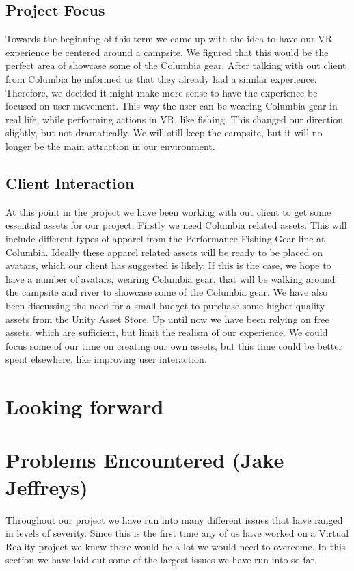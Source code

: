 \documentclass[10pt,journal,compsoc,onecolumn, draftclsnofoot]{IEEEtran}
\begin{document}
\subsection{Project Focus}
Towards the beginning of this term we came up with the idea to have our VR experience be centered around a campsite.
We figured that this would be the perfect area of showcase some of the Columbia gear.
After talking with out client from Columbia he informed us that they already had a similar experience.
Therefore, we decided it might make more sense to have the experience be focused on user movement.
This way the user can be wearing Columbia gear in real life, while performing actions in VR, like fishing.
This changed our direction slightly, but not dramatically.
We will still keep the campsite, but it will no longer be the main attraction in our environment.

\subsection{Client Interaction}
At this point in the project we have been working with out client to get some essential assets for our project.
Firstly we need Columbia related assets.
This will include different types of apparel from the Performance Fishing Gear line at Columbia.
Ideally these apparel related assets will be ready to be placed on avatars, which our client has suggested is likely.
If this is the case, we hope to have a number of avatars, wearing Columbia gear, that will be walking around the campsite and river to showcase some of the Columbia gear.
We have also been discussing the need for a small budget to purchase some higher quality assets from the Unity Asset Store.
Up until now we have been relying on free assets, which are sufficient, but limit the realism of our experience.
We could focus some of our time on creating our own assets, but this time could be better spent elsewhere, like improving user interaction.

\section{Looking forward}

\section{Problems Encountered (Jake Jeffreys)}
Throughout our project we have run into many different issues that have ranged in levels of severity.
Since this is the first time any of us have worked on a Virtual Reality project we knew there would be a lot we would need to overcome.
In this section we have laid out some of the largest issues we have run into so far.
\end{document}
